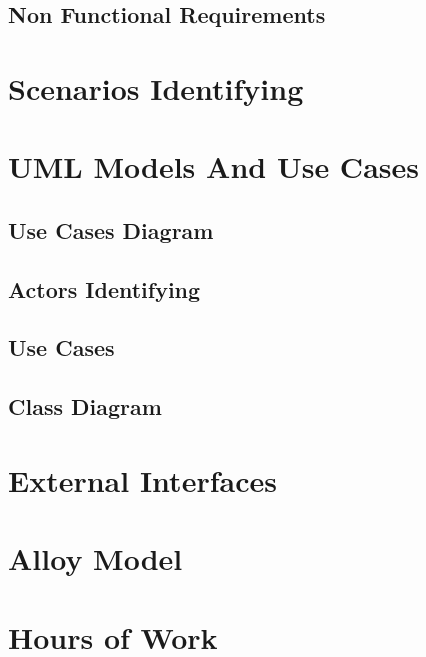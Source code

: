 \documentclass[english]{article}
\begin{document}
	\subsection{Non Functional Requirements}

\section{Scenarios Identifying}
\section{UML Models And Use Cases}
	\subsection{Use Cases Diagram}
	\subsection{Actors Identifying}
	\subsection{Use Cases}

	\subsection{Class Diagram}
\section{External Interfaces}
\section{Alloy Model}
\section{Hours of Work}
\end{document}
